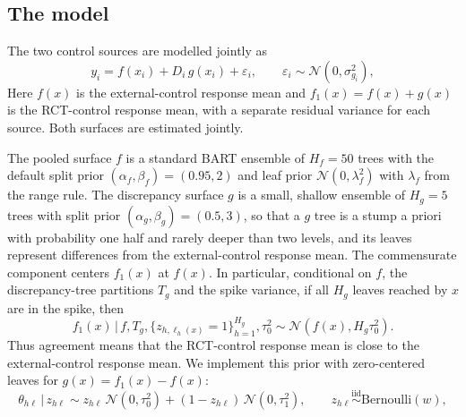 \documentclass[11pt]{article}
\newcommand{\Normal}{\mathcal{N}}
\newcommand{\Ber}{\mathrm{Bernoulli}}
\newcommand{\given}{\,\vert\,}
\newcommand{\iid}{\stackrel{\text{iid}}{\sim}}
\theoremstyle{definition}
\theoremstyle{plain}
\begin{document}
\subsection{The model}
\label{sec:model}

The two control sources are modelled jointly as
\begin{equation}
y_i=f(x_i)+D_i\,g(x_i)+\varepsilon_i,\qquad \varepsilon_i\sim\Normal(0,\sigma^2_{g_i}),
\label{eq:model}
\end{equation}
Here $f(x)$ is the external-control response mean and $f_1(x)=f(x)+g(x)$ is the RCT-control response mean, with a separate residual variance for each source. Both surfaces are estimated jointly.

The pooled surface $f$ is a standard BART ensemble of $H_f=50$ trees with the default split prior $(\alpha_f,\beta_f)=(0.95,2)$ and leaf prior $\Normal(0,\lambda_f^2)$ with $\lambda_f$ from the range rule. The discrepancy surface $g$ is a small, shallow ensemble of $H_g=5$ trees with split prior $(\alpha_g,\beta_g)=(0.5,3)$, so that a $g$ tree is a stump a priori with probability one half and rarely deeper than two levels, and its leaves represent differences from the external-control response mean. The commensurate component centers $f_1(x)$ at $f(x)$. In particular, conditional on $f$, the discrepancy-tree partitions $T_g$ and the spike variance, if all $H_g$ leaves reached by $x$ are in the spike, then
\[
f_1(x)\given f,T_g,\{z_{h,\ell_h(x)}=1\}_{h=1}^{H_g},\tau_0^2
\sim\Normal\!\left(f(x),H_g\tau_0^2\right).
\]
Thus agreement means that the RCT-control response mean is close to the external-control response mean. We implement this prior with zero-centered leaves for $g(x)=f_1(x)-f(x)$:
\begin{equation}
\theta_{h\ell}\given z_{h\ell}\sim z_{h\ell}\,\Normal(0,\tau_0^2)+(1-z_{h\ell})\,\Normal(0,\tau_1^2),\qquad z_{h\ell}\iid\Ber(w),
\label{eq:leafprior}
\end{equation}
\end{document}
